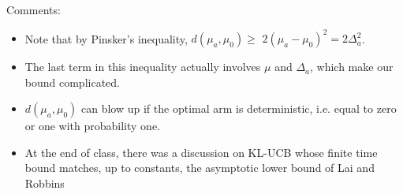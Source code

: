 \documentclass[11pt]{article}
\begin{document}
\noindent Comments:
\begin{itemize}
\item Note that by Pinsker's inequality, $d(\mu_a, \mu_0) \geq$ $2(\mu_a - \mu_0)^2=2\Delta_a^2$.
\item The last term in this inequality actually involves $\mu$ and $\Delta_a$, which make our bound complicated.
\item $d(\mu_a,\mu_0)$ can blow up if the optimal arm is
  deterministic, i.e. equal to zero or one with probability
          one. 
	\item At the end of class, there was a discussion on KL-UCB \cite{garivier2011kl} whose finite time bound matches, up to constants, the asymptotic lower bound of Lai and Robbins \cite{lai1985asymptotically}
\end{itemize}
		

\end{document}

